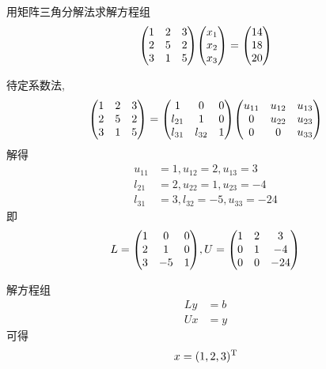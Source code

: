 \begin{example}
    用矩阵三角分解法求解方程组
    \begin{equation*}
        \mqty(
            1&2&3\\
            2&5&2\\
            3&1&5
        )\mqty(x_1\\x_2\\x_3)=\mqty(14\\18\\20)
    \end{equation*}
\end{example}
\begin{solution}
    待定系数法, 
    \begin{equation*}
        \mqty(
            1&2&3\\
            2&5&2\\
            3&1&5
        )=\mqty(
            1&0&0\\
            l_{21}&1&0\\
            l_{31}&l_{32}&1
        )\mqty(
            u_{11}&u_{12}&u_{13}\\
            0&u_{22}&u_{23}\\
            0&0&u_{33}
        )
    \end{equation*}
    解得
    \begin{align*}
        u_{11}&=1, u_{12}=2, u_{13}=3\\
        l_{21}&=2, u_{22}=1, u_{23}=-4\\
        l_{31}&=3, l_{32}=-5, u_{33}=-24
    \end{align*}
    即
    \begin{equation*}
        L=\mqty(
            1&0&0\\
            2&1&0\\
            3&-5&1
        ), U=\mqty(
            1&2&3\\
            0&1&-4\\
            0&0&-24
        )
    \end{equation*}

    解方程组
    \begin{align*}
        Ly&=b\\
        Ux&=y
    \end{align*}
    可得
    \begin{equation*}
        x=(1,2,3)^\text{T}
    \end{equation*}
\end{solution}

